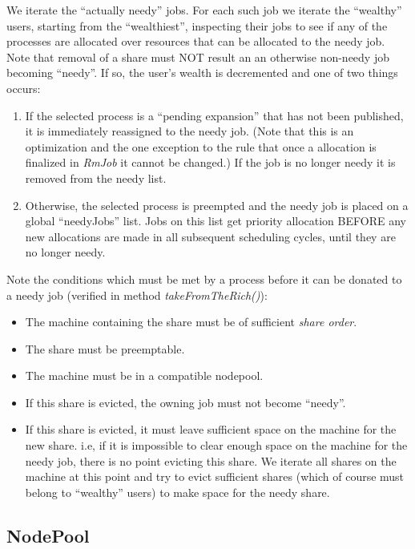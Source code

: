     We iterate the ``actually needy'' jobs.  For each such job we iterate the ``wealthy'' users,
    starting from the ``wealthiest'', inspecting their jobs to see if any of the processes are
    allocated over resources that can be allocated to the needy job.  Note that removal of a share
    must NOT result an an otherwise non-needy job becoming ``needy''.  If so, the user's wealth is
    decremented and one of two things occurs:
    \begin{enumerate}
      \item If the selected process is a ``pending expansion'' that has not been published,
        it is immediately reassigned to the needy job.  (Note that this is an optimization and
        the one exception to the rule that once a allocation is finalized in {\em RmJob}
        it cannot be changed.) If the job is no longer needy it
        is removed from the needy list.
      \item Otherwise, the selected process is preempted and the needy job is placed on
        a global ``needyJobs'' list.  Jobs on this list get priority allocation BEFORE
        any new allocations are made in all subsequent scheduling cycles, until they
        are no longer needy.
    \end{enumerate}
    
    Note the conditions which must be met by a process before it can be donated to a needy job
    (verified in method {\em takeFromTheRich()}):
    \begin{itemize}
      \item The machine containing the share must be of sufficient {\em share order}.
      \item The share must be preemptable.
      \item The machine must be in a compatible nodepool.
      \item If this share is evicted, the owning job must not become ``needy''.
      \item If this share is evicted, it must leave sufficient space on the machine for the new
        share.  i.e, if it is impossible to clear enough space on the machine for the needy job,
        there is no point evicting this share. We iterate all shares on the machine at this point
        and try to evict sufficient shares (which of course must belong to ``wealthy'' users) to
        make space for the needy share.
    \end{itemize}
             
\subsection{NodePool}

